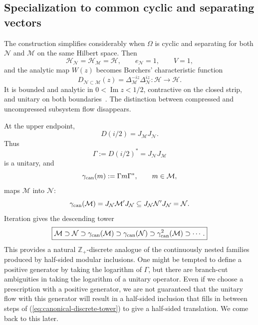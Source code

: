 \documentclass[a4paper,11pt]{article}
\theoremstyle{definition}
\newcommand{\mN}{\mathcal{N}}
\newcommand{\mH}{\mathcal{H}}
\newcommand{\mM}{\mathcal{M}}
\begin{document}
\subsection{Specialization to common cyclic and separating vectors}
\label{subsec:probing-common-cyclic}

The construction simplifies considerably when $\Omega$ is cyclic and
separating for both $\mN$ and $\mM$ on the same Hilbert space.
Then
\begin{equation}
    \mH_{\mN}=\mH_{\mM}=\mathcal H,
    \qquad
    e_{\mN}=1,
    \qquad
    V=1,
\end{equation}
and the analytic map $W(z)$ becomes Borchers' characteristic function
\begin{equation}
    \boxed{
    D_{\mN\subset\mM}(z)
    =
    \Delta_{\mM}^{-iz}\Delta_{\mN}^{iz}
    :
    \mathcal H\to\mathcal H .
    }
    \label{eq:D-common-probing}
\end{equation}
It is bounded and analytic in
$0<\operatorname{Im}z<1/2$, contractive on the closed strip, and unitary on
both boundaries~\cite{revolutionizing}. The distinction between compressed
and uncompressed subsystem flow disappears.

At the upper endpoint,
\begin{equation}
    \boxed{
    D(i/2)=J_{\mM}J_{\mN} .
    }
    \label{eq:D-half-common}
\end{equation}
Thus
\begin{equation}
    \Gamma:=D(i/2)^*=J_{\mN}J_{\mM}
\end{equation}
is a unitary, and
\begin{equation}
    \gamma_{\rm can}(m)
    :=
    \Gamma m\Gamma^*,
    \qquad
    m\in\mM,
    \label{eq:canonical-endomorphism-common}
\end{equation}
maps $\mM$ into $\mN$:
\begin{equation}
    \gamma_{\rm can}(\mM)
    =
    J_{\mN}\mM'J_{\mN}
    \subseteq
    J_{\mN}\mN'J_{\mN}
    =
    \mN .
\end{equation}
Iteration gives the descending tower
\begin{equation}
    \boxed{
    \mM
    \supset
    \mN
    \supset
    \gamma_{\rm can}(\mM)
    \supset
    \gamma_{\rm can}(\mN)
    \supset
    \gamma_{\rm can}^2(\mM)
    \supset\cdots .
    }
    \label{eq:canonical-discrete-tower}
\end{equation}
This provides a natural $\mathbb Z_+$-discrete analogue of the continuously
nested families produced by half-sided modular inclusions. One might be tempted to define a positive generator by taking the logarithm of $\Gamma$, but there are branch-cut ambiguities in taking the logarithm of a unitary operator. 
Even if we choose a prescription with a positive generator, we are not guaranteed that the unitary flow with this generator will result in a half-sided inclusion that fills in between steps of (\ref{eq:canonical-discrete-tower}) to give a half-sided translation. We come back to this later.
\end{document}
